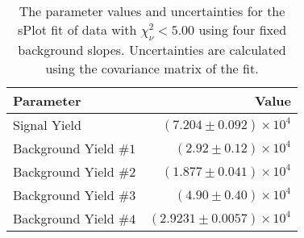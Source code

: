
\begin{table}[ht]
    \begin{center}
        \begin{tabular}{lr}\toprule
            Parameter & Value \\\midrule
            Signal Yield & $(7.204 \pm 0.092) \times 10^{4}$ \\
            Background Yield $\#1$ & $(2.92 \pm 0.12) \times 10^{4}$ \\
            Background Yield $\#2$ & $(1.877 \pm 0.041) \times 10^{4}$ \\
            Background Yield $\#3$ & $(4.90 \pm 0.40) \times 10^{4}$ \\
            Background Yield $\#4$ & $(2.9231 \pm 0.0057) \times 10^{4}$ \\\bottomrule
        \end{tabular}
        \caption{The parameter values and uncertainties for the sPlot fit of data with $\chi^2_\nu < 5.00$ using four fixed background slopes. Uncertainties are calculated using the covariance matrix of the fit.}\label{tab:splot-fit-results-chisqdof-5.00-fixed-4}
    \end{center}
\end{table}
